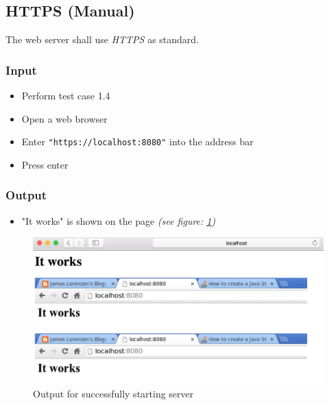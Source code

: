 \documentclass[a4paper, 12pt]{article}
\begin{document}
\subsection{HTTPS (Manual)}

The web server shall use \textit{HTTPS} as standard.

\subsubsection{Input}
\begin{itemize}
\item Perform test case 1.4
\item Open a web browser
\item Enter \texttt{"https://localhost:8080"} into the address bar
\item Press enter
\end{itemize}

\subsubsection{Output}
\begin{itemize}
\item "It works" is shown on the page \textit{(see figure: \ref{TC6.1})}
\end{itemize}

\begin{figure}[H]
\includegraphics[scale=0.5]{output_clarification/TC1-1.png} 
\caption{Output for successfully starting server}
\label{TC6.1}
\end{figure}
\end{document}
